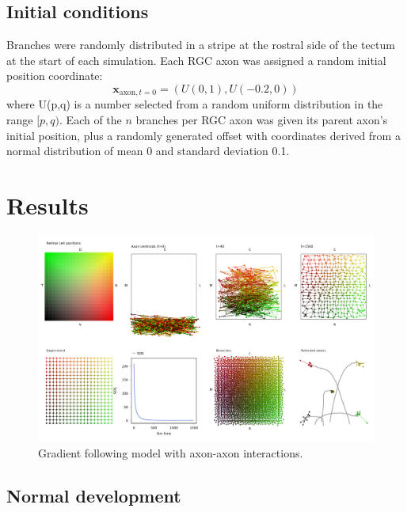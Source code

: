 \documentclass[11pt, a4paper]{article}
\begin{document}
\subsection*{Initial conditions}

Branches were randomly distributed in a stripe at the rostral side of the
tectum at the start of each simulation. Each RGC axon was assigned a random
initial position coordinate:
\begin{equation}
\mathbf{x}_{\text{axon},t=0} = (U(0,1), U(-0.2,0))
\end{equation}
where U(p,q) is a number selected from a random uniform distribution in the
range $[p,q)$. Each of the $n$ branches per RGC axon was given its parent
axon's initial position, plus a randomly generated offset with coordinates
derived from a normal distribution of mean 0 and standard deviation 0.1.

\section{Results}

\begin{figure}
\includegraphics[width=\linewidth]{./images/j4_ee_wt_fig.png}
\caption{Gradient following model with axon-axon interactions.}
\label{f:wt}
\end{figure}

\subsection*{Normal development}
\end{document}
